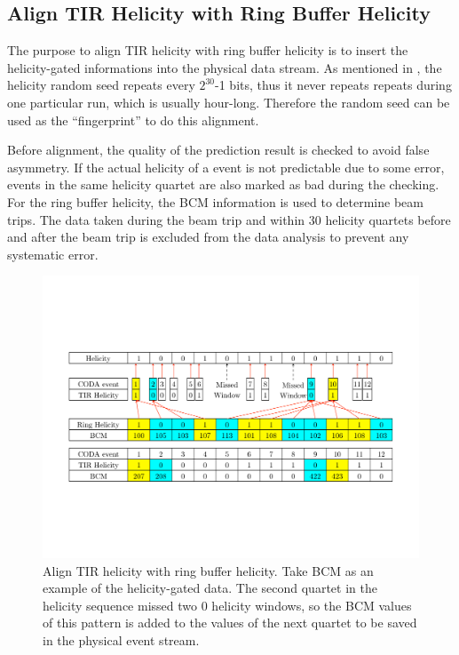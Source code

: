 \subsection{Align TIR Helicity with Ring Buffer Helicity}
\label{A1S2SS3}

The purpose to align TIR helicity with ring buffer helicity is to insert the helicity-gated informations into the physical data stream. As mentioned in , the helicity random seed repeats every $2^{30}$-1 bits, thus it never repeats repeats during one particular run, which is usually hour-long. Therefore the random seed can be used as the ``fingerprint'' to do this alignment.

Before alignment, the quality of the prediction result is checked to avoid false asymmetry. If the actual helicity of a event is not predictable due to some error, events in the same helicity quartet are also marked as bad during the checking. For the ring buffer helicity, the BCM information is used to determine beam trips. The data taken during the beam trip and within 30 helicity quartets before and after the beam trip is excluded from the data analysis to prevent any systematic error.

\begin{figure}[tb!]
  \centering
  \includegraphics[width=\textwidth]{figs/helicity-align.pdf}
  \caption[Align TIR helicity with ring buffer helicity.]{Align TIR helicity with ring buffer helicity. Take BCM as an example of the helicity-gated data. The second quartet in the helicity sequence missed two 0 helicity windows, so the BCM values of this pattern is added to the values of the next quartet to be saved in the physical event stream. \label{A1S2SS3F1} }
\end{figure}

